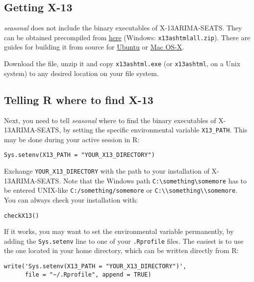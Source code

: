 \subsection{Getting X-13}\label{getting-x-13}

\emph{seasonal} does not include the binary executables of
X-13ARIMA-SEATS. They can be obtained precompiled from
\href{http://www.census.gov/srd/www/x13as/x13down_pc.html}{here}
(Windows: \texttt{x13ashtmlall.zip}). There are guides for building it
from source for
\href{http://askubuntu.com/questions/444354/how-do-i-install-x13-arima-seats-for-rstudio-from-source}{Ubuntu}
or
\href{https://github.com/christophsax/seasonal/wiki/Compiling-X-13ARIMA-SEATS-from-Source-for-OS-X}{Mac
OS-X}.

Download the file, unzip it and copy \texttt{x13ashtml.exe} (or
\texttt{x13ashtml}, on a Unix system) to any desired location on your
file system.

\subsection{Telling R where to find
X-13}\label{telling-r-where-to-find-x-13}

Next, you need to tell \emph{seasonal} where to find the binary
executables of X-13ARIMA-SEATS, by setting the specific environmental
variable \texttt{X13\_PATH}. This may be done during your active session
in R:

\begin{verbatim}
Sys.setenv(X13_PATH = "YOUR_X13_DIRECTORY")
\end{verbatim}

Exchange \texttt{YOUR\_X13\_DIRECTORY} with the path to your
installation of X-13ARIMA-SEATS. Note that the Windows path
\texttt{C:\textbackslash{}something\textbackslash{}somemore} has to be
entered UNIX-like \texttt{C:/something/somemore} or
\texttt{C:\textbackslash{}\textbackslash{}something\textbackslash{}\textbackslash{}somemore}.
You can always check your installation with:

\begin{verbatim}
checkX13()
\end{verbatim}

If it works, you may want to set the environmental variable permanently,
by adding the \texttt{Sys.setenv} line to one of your \texttt{.Rprofile}
files. The easiest is to use the one located in your home directory,
which can be written directly from R:

\begin{verbatim}
write('Sys.setenv(X13_PATH = "YOUR_X13_DIRECTORY")', 
      file = "~/.Rprofile", append = TRUE)
\end{verbatim}

